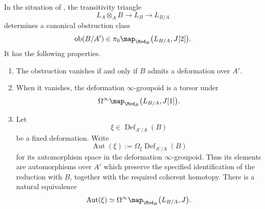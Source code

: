 \begin{theorem}
\label{thm:affine-cotangent-obstruction}
In the situation of
, the transitivity triangle
\[
    L_A\otimes_AB
    \longrightarrow
    L_B
    \longrightarrow
    L_{B/A}
\]
determines a canonical obstruction class
\[
    \operatorname{ob}(B/A')
    \in
    \pi_0
    \map_{\Mod_B}
    \bigl(
        L_{B/A},
        J[2]
    \bigr).
\]
It has the following properties.
\begin{enumerate}[label=(\roman*)]
    \item The obstruction vanishes if and only if $B$ admits a
    deformation over $A'$.

    \item When it vanishes, the deformation $\infty$-groupoid is a
    torsor under
    \[
        \Omega^\infty
        \map_{\Mod_B}
        \bigl(
            L_{B/A},
            J[1]
        \bigr).
    \]

    \item Let
    \[
        \xi
        \in
        \operatorname{Def}_{A'/A}(B)
    \]
    be a fixed deformation. Write
    \[
        \operatorname{Aut}(\xi)
        :=
        \Omega_\xi
        \operatorname{Def}_{A'/A}(B)
    \]
    for its automorphism space in the deformation $\infty$-groupoid.
    Thus its elements are automorphisms over $A'$ which preserve the
    specified identification of the reduction with $B$, together with
    the required coherent homotopy. There is a natural equivalence
    \[
        \operatorname{Aut}(\xi)
        \simeq
        \Omega^\infty
        \map_{\Mod_B}
        \bigl(
            L_{B/A},
            J
        \bigr).
    \]
\end{enumerate}
\end{theorem}

